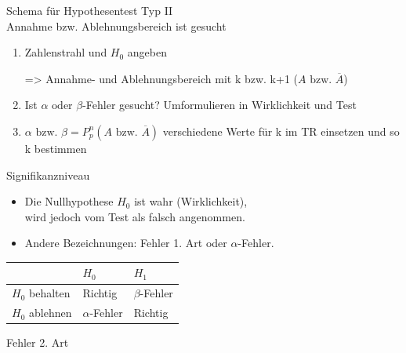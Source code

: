 \documentclass[paper=a6,landscape,ngerman,twoside=true,fontsize=12pt]{scrartcl}
\begin{document}
\begin{frage}
	Schema für Hypothesentest Typ II\\
	Annahme bzw. Ablehnungsbereich ist gesucht
	
\end{frage}
\begin{antwort}
	\begin{enumerate}
		\item Zahlenstrahl und $H_0$ angeben
		
		=> Annahme- und Ablehnungsbereich mit k bzw. k+1 ($A \text{ bzw. }\overline{A}$)	
		\item Ist  $\alpha \text{ oder }\beta$-Fehler gesucht? Umformulieren in Wirklichkeit und Test
		\item $\alpha \text{ bzw. }\beta=P^n_p(A\text{ bzw. }\overline{A})$ verschiedene Werte für k im TR einsetzen und so k bestimmen
	\end{enumerate}
	
\end{antwort}	
\begin{frage}
	Signifikanzniveau
	
\end{frage}
\begin{antwort}\large
	\begin{itemize}
		\item Die Nullhypothese $H_0$ ist wahr (Wirklichkeit), \\
		 wird jedoch vom Test als falsch angenommen.
		\item Andere Bezeichnungen: Fehler 1. Art oder $\alpha$-Fehler.	
	\end{itemize}
	\begin{center}
		\normalsize
		\begin{tabularx}{\textwidth}{|>{\centering\arraybackslash}X|>{\centering\arraybackslash}X|>{\centering\arraybackslash}X|}
			\hline
			\diagbox{Test}{Wirkl.} & $H_0$ & $H_1$ \\ \hline
			$H_0$ behalten & Richtig & $\beta$-Fehler \\ \hline
			$H_0$ ablehnen & $\alpha$-Fehler & Richtig \\ \hline
		\end{tabularx}
	\end{center}
\end{antwort}
\begin{frage}
	Fehler 2. Art
	
\end{frage}
\end{document}
